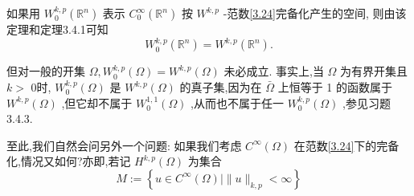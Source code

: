 \documentclass[lang=cn,newtx,10pt,scheme=chinese,thmcnt=chapter]{elegantbook}
\begin{document}
\begin{note}
    如果用 \({W}_{0}^{k,p}\left( {\mathbb{R}}^{n}\right)\) 表示 \({C}_{0}^{\infty }\left( {\mathbb{R}}^{n}\right)\) 按 \({W}^{k,p}\) -范数\ref{3.24}完备化产生的空间, 则由该定理和定理3.4.1可知
\begin{equation*}
{W}_{0}^{k,p}\left( {\mathbb{R}}^{n}\right)  = {W}^{k,p}\left( {\mathbb{R}}^{n}\right) .
\end{equation*}

但对一般的开集 \(\Omega ,{W}_{0}^{k,p}\left( \Omega \right)  = {W}^{k,p}\left( \Omega \right)\) 未必成立. 事实上,当 \(\Omega\) 为有界开集且 \(k >\) 0时, \({W}_{0}^{k,p}\left( \Omega \right)\) 是 \({W}^{k,p}\left( \Omega \right)\) 的真子集,因为在 \(\bar{\Omega }\) 上恒等于 1 的函数属于 \({W}^{k,p}\left( \Omega \right)\) ,但它却不属于 \({W}_{0}^{1,1}\left( \Omega \right)\) ,从而也不属于任一 \({W}_{0}^{k,p}\left( \Omega \right)\) ,参见习题3.4.3.
\end{note}

至此,我们自然会问另外一个问题: 如果我们考虑 \({C}^{\infty }\left( \Omega \right)\) 在范数\ref{3.24}下的完备化,情况又如何?亦即,若记 \({H}^{k,p}\left( \Omega \right)\) 为集合
\begin{equation*}
M \mathrel{\text{ := }} \left\{  {u \in  {C}^{\infty }\left( \Omega \right)  \mid  \parallel u{\parallel }_{k,p} < \infty }\right\}
\end{equation*}
\end{document}
